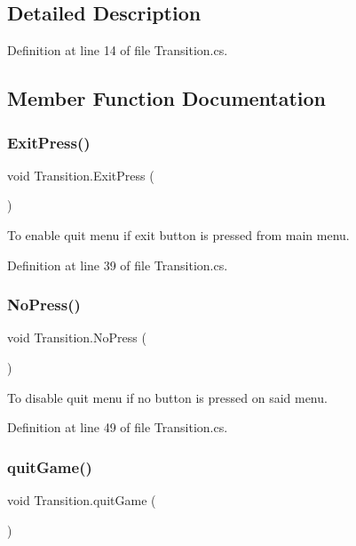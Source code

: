 \subsection{Detailed Description}


Definition at line 14 of file Transition.\+cs.



\subsection{Member Function Documentation}
\hypertarget{class_transition_acab716cbd4bcbd3da46e1161cd2a43e2}{}\label{class_transition_acab716cbd4bcbd3da46e1161cd2a43e2} 
\subsubsection{\texorpdfstring{Exit\+Press()}{ExitPress()}}
{\footnotesize\ttfamily void Transition.\+Exit\+Press (\begin{DoxyParamCaption}{ }\end{DoxyParamCaption})}

To enable quit menu if exit button is pressed from main menu. 

Definition at line 39 of file Transition.\+cs.

\hypertarget{class_transition_a10c8060f16a9b5d09ce4524b9f8efa0f}{}\label{class_transition_a10c8060f16a9b5d09ce4524b9f8efa0f} 
\subsubsection{\texorpdfstring{No\+Press()}{NoPress()}}
{\footnotesize\ttfamily void Transition.\+No\+Press (\begin{DoxyParamCaption}{ }\end{DoxyParamCaption})}

To disable quit menu if no button is pressed on said menu. 

Definition at line 49 of file Transition.\+cs.

\hypertarget{class_transition_ad49e89dfdf52c7cda9d0cbbe4639d6e6}{}\label{class_transition_ad49e89dfdf52c7cda9d0cbbe4639d6e6} 
\subsubsection{\texorpdfstring{quit\+Game()}{quitGame()}}
{\footnotesize\ttfamily void Transition.\+quit\+Game (\begin{DoxyParamCaption}{ }\end{DoxyParamCaption})}

